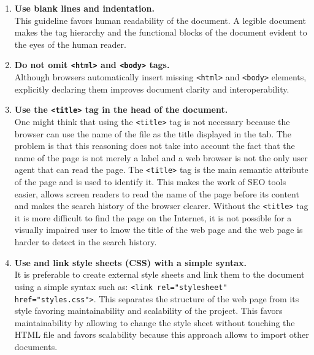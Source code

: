 \documentclass{scrbook}
\begin{document}
\begin{enumerate}
    \item 
    \parbox[t]{\linewidth}{
        \textbf{Use blank lines and indentation.} \\
        This guideline favors human readability of the document. A legible document makes the tag hierarchy and the functional blocks of the document evident to the eyes of the human reader. 
    }

    \item 
    \parbox[t]{\linewidth}{
        \textbf{Do not omit \texttt{<html>} and \texttt{<body>} tags.} \\
        Although browsers automatically insert missing \texttt{<html>} and \texttt{<body>} elements, explicitly declaring them improves document clarity and interoperability. 
    }

    \item 
    \parbox[t]{\linewidth}{
        \textbf{Use the \texttt{<title>} tag in the head of the document.} \\
        One might think that using the \texttt{<title>} tag is not necessary because the browser can use the name of the file as the title displayed in the tab. The problem is that this reasoning does not take into account the fact that the name of the page is not merely a label and a web browser is not the only user agent that can read the page. The \texttt{<title>} tag is the main semantic attribute of the page and is used to identify it. This makes the work of SEO tools easier, allows screen readers to read the name of the page before its content and makes the search history of the browser clearer. Without the \texttt{<title>} tag it is more difficult to find the page on the Internet, it is not possible for a visually impaired user to know the title of the web page and the web page is harder to detect in the search history.
    }

    \item 
    \parbox[t]{\linewidth}{
        \textbf{Use and link style sheets (CSS) with a simple syntax.} \\
        It is preferable to create external style sheets and link them to the document using a simple syntax such as: \texttt{<link rel="stylesheet" href="styles.css">}. This separates the structure of the web page from its style favoring maintainability and scalability of the project. This favors maintainability by allowing to change the style sheet without touching the HTML file and favors scalability because this approach allows to import other documents.
    }


\end{enumerate}
\end{document}
